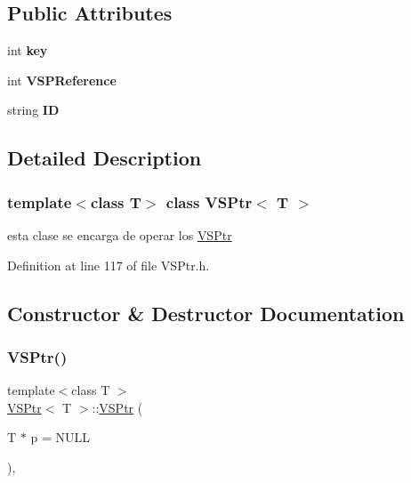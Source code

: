 \subsection*{Public Attributes}
\begin{DoxyCompactItemize}
\item 
\mbox{\label{classVSPtr_ab828835781c0eeeb3117062df076114c}} 
int {\bfseries key}
\item 
\mbox{\label{classVSPtr_a6a85e6000211be8d0d8449c581fce8c3}} 
int {\bfseries V\+S\+P\+Reference}
\item 
\mbox{\label{classVSPtr_a993892d6deca306b3f80711523bdff36}} 
string {\bfseries ID}
\end{DoxyCompactItemize}


\subsection{Detailed Description}
\subsubsection*{template$<$class T$>$\newline
class V\+S\+Ptr$<$ T $>$}

esta clase se encarga de operar los \hyperlink{classVSPtr}{V\+S\+Ptr} 

Definition at line 117 of file V\+S\+Ptr.\+h.



\subsection{Constructor \& Destructor Documentation}
\mbox{\label{classVSPtr_af09710020eb6adeb5f4b2ec05135424a}} 
\subsubsection{\texorpdfstring{V\+S\+Ptr()}{VSPtr()}}
{\footnotesize\ttfamily template$<$class T $>$ \\
\hyperlink{classVSPtr}{V\+S\+Ptr}$<$ T $>$\+::\hyperlink{classVSPtr}{V\+S\+Ptr} (\begin{DoxyParamCaption}\item[{T $\ast$}]{p = {\ttfamily NULL} }\end{DoxyParamCaption})\hspace{0.3cm}{\ttfamily [inline]}, {\ttfamily [explicit]}}



